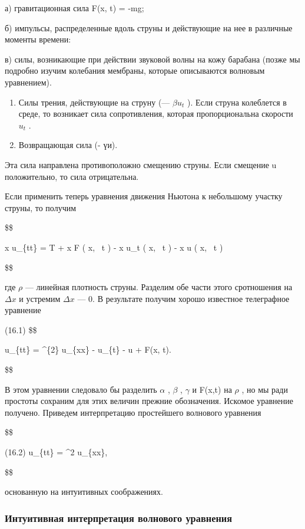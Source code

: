 \documentclass[
  ukrainian,
]{article}
\begin{document}
а) гравитационная сила F(x, t) = -mg;

б) импульсы, распределенные вдоль струны и действующие на нее в
различные моменты времени:

в) силы, возникающие при действии звуковой волны на кожу барабана (позже
мы подробно изучим колебания мембраны, которые описываются волновым
уравнением).

\begin{enumerate}
\def\labelenumi{\arabic{enumi}.}
\setcounter{enumi}{2}
\item
  Силы трения, действующие на струну (--- \(\beta u_t\) ). Если струна
  колеблется в среде, то возникает сила сопротивления, которая
  пропорциональна скорости \(u_t\) .
\item
  Возвращающая сила (- үи).
\end{enumerate}

Эта сила направлена противоположно смещению струны. Если смещение u
положительно, то сила отрицательна.

Если применить теперь уравнения движения Ньютона к небольшому участку
струны, то получим

\$\$

\Delta x \rho u\_\{tt\} = T
 +
\Delta x F \left( x, ~t \right) - \Delta x \beta u\_t \left( x, ~t
\right) - \Delta x \gamma u \left( x, ~t \right)

\$\$

где \(\rho\) --- линейная плотность струны. Разделим обе части этого
сротношения на \(\Delta x\) и устремим \(\Delta x\) --- 0. В результате
получим хорошо известное телеграфное уравнение

(16.1) \$\$

u\_\{tt\} = \alpha\^{}\{2\} u\_\{xx\} - \beta u\_\{t\} - \gamma u + F(x,
t).

\$\$

В этом уравнении следовало бы разделить \(\alpha\) , \(\beta\) ,
\(\gamma\) и F(x,t) на \(\rho\) , но мы ради простоты сохраним для этих
величин прежние обозначения. Искомое уравнение получено. Приведем
интерпретацию простейшего волнового уравнения

\$\$

(16.2) u\_\{tt\} = \alpha\^{}2 u\_\{xx\},

\$\$

основанную на интуитивных соображениях.

\subsubsection{Интуитивная интерпретация волнового
уравнения}\label{ux438ux43dux442ux443ux438ux442ux438ux432ux43dux430ux44f-ux438ux43dux442ux435ux440ux43fux440ux435ux442ux430ux446ux438ux44f-ux432ux43eux43bux43dux43eux432ux43eux433ux43e-ux443ux440ux430ux432ux43dux435ux43dux438ux44f}
\end{document}
